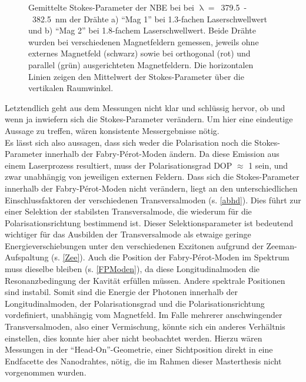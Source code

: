 \begin{figure}[h]
\caption{Gemittelte Stokes-Parameter der NBE bei bei \mbox{$\uplambda=$ 379.5 - 382.5 nm} der Drähte a) ``Mag 1'' bei 1.3-fachen Laserschwellwert und b) ``Mag 2'' bei 1.8-fachem Laserschwellwert. Beide Drähte wurden bei verschiedenen Magnetfeldern gemessen, jeweils ohne externes Magnetfeld (schwarz) sowie bei orthogonal (rot) und parallel (grün) ausgerichteten Magnetfeldern. Die horizontalen Linien zeigen den Mittelwert der Stokes-Parameter über die vertikalen Raumwinkel.}
\label{Stokes_NBE_Mag}
\end{figure}  Letztendlich geht aus dem Messungen nicht klar und schlüssig hervor, ob und wenn ja inwiefern sich die Stokes-Parameter verändern. Um hier eine eindeutige Aussage zu treffen, wären konsistente Messergebnisse nötig.\\
Es lässt sich also aussagen, dass sich weder die Polarisation noch die Stokes-Parameter innerhalb der Fabry-Pérot-Moden ändern. Da diese Emission aus einem Laserprozess resultiert, muss der Polarisationsgrad DOP $\approx$ 1 sein, und zwar unabhängig von jeweiligen externen Feldern. Dass sich die Stokes-Parameter innerhalb der Fabry-Pérot-Moden nicht verändern, liegt an den unterschiedlichen Einschlussfaktoren der verschiedenen Transversalmoden (s. \autoref{abhd}). Dies führt zur einer Selektion der stabilsten Transversalmode, die wiederum für die Polarisationsrichtung bestimmend ist. Dieser Selektionsparameter ist bedeutend wichtiger für das Ausbilden der Transversalmode als etwaige geringe Energieverschiebungen unter den verschiedenen Exzitonen aufgrund der Zeeman-Aufspaltung (s. \autoref{Zee}). Auch die Position der Fabry-Pérot-Moden im Spektrum muss dieselbe bleiben (s. \autoref{FPModen}), da diese Longitudinalmoden die Resonanzbedingung der Kavität erfüllen müssen. Andere spektrale Positionen sind instabil. Somit sind die Energie der Photonen innerhalb der Longitudinalmoden, der Polarisationsgrad und die Polarisationsrichtung vordefiniert, unabhängig vom Magnetfeld. Im Falle mehrerer anschwingender Transversalmoden, also einer Vermischung, könnte sich ein anderes Verhältnis einstellen, dies konnte hier aber nicht beobachtet werden. Hierzu wären Messungen in der ``Head-On''-Geometrie, einer Sichtposition direkt in eine Endfacette des Nanodrahtes, nötig, die im Rahmen dieser Masterthesis nicht vorgenommen wurden.\\

